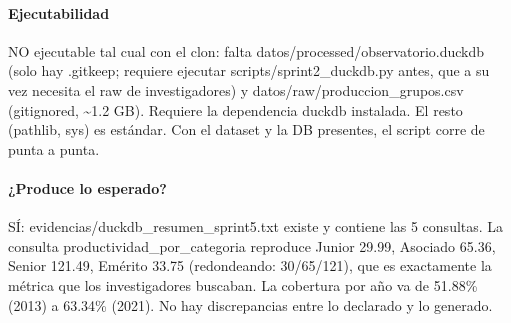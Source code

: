 \paragraph{Ejecutabilidad}
NO ejecutable tal cual con el clon: falta datos/processed/observatorio.duckdb (solo hay .gitkeep; requiere ejecutar scripts/sprint2\_duckdb.py antes, que a su vez necesita el raw de investigadores) y datos/raw/produccion\_grupos.csv (gitignored, \textasciitilde{}1.2 GB). Requiere la dependencia duckdb instalada. El resto (pathlib, sys) es estándar. Con el dataset y la DB presentes, el script corre de punta a punta.

\paragraph{¿Produce lo esperado?}
SÍ: evidencias/duckdb\_resumen\_sprint5.txt existe y contiene las 5 consultas. La consulta productividad\_por\_categoria reproduce Junior 29.99, Asociado 65.36, Senior 121.49, Emérito 33.75 (redondeando: 30/65/121), que es exactamente la métrica que los investigadores buscaban. La cobertura por año va de 51.88\% (2013) a 63.34\% (2021). No hay discrepancias entre lo declarado y lo generado.

